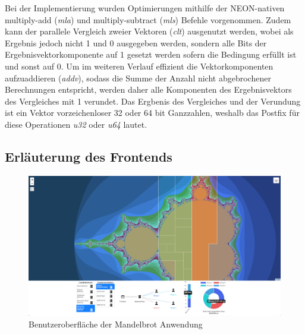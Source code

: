 Bei der Implementierung wurden Optimierungen mithilfe der NEON-nativen multiply-add (\textit{mla}) und multiply-subtract (\textit{mls}) Befehle vorgenommen.
Zudem kann der parallele Vergleich zweier Vektoren (\textit{clt}) ausgenutzt werden, wobei als Ergebnis jedoch nicht 1 und 0 ausgegeben werden,
sondern alle Bits der Ergebnisvektorkomponente auf 1 gesetzt werden sofern die Bedingung erfüllt ist und sonst auf 0.
Um im weiteren Verlauf effizient die Vektorkomponenten aufzuaddieren (\textit{addv}), sodass die Summe der Anzahl nicht abgebrochener Berechnungen entspricht,
werden daher alle Komponenten des Ergebnisvektors des Vergleiches mit 1 verundet.
Das Ergbenis des Vergleiches und der Verundung ist ein Vektor vorzeichenloser 32 oder 64 bit Ganzzahlen, weshalb das
Postfix für diese Operationen \textit{u32} oder \textit{u64} lautet.

\begin{figure}
	
\end{figure}


\subsection{Erläuterung des Frontends}

\begin{figure}
	\centering
	\includegraphics[width=\linewidth]{img/Implementierung/UI-Screenshot}
	\caption{Benutzeroberfläche der Mandelbrot Anwendung}
	\label{fig:ui-screenshot}
\end{figure}

